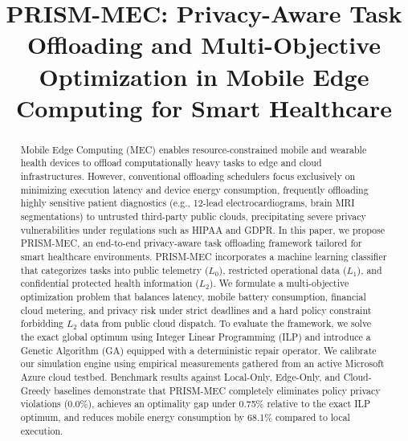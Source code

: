 \documentclass[conference]{IEEEtran}
\begin{document}
\title{PRISM-MEC: Privacy-Aware Task Offloading and Multi-Objective Optimization in Mobile Edge Computing for Smart Healthcare}

\author{
}

\maketitle

\begin{abstract}
Mobile Edge Computing (MEC) enables resource-constrained mobile and wearable health devices to offload computationally heavy tasks to edge and cloud infrastructures. However, conventional offloading schedulers focus exclusively on minimizing execution latency and device energy consumption, frequently offloading highly sensitive patient diagnostics (e.g., 12-lead electrocardiograms, brain MRI segmentations) to untrusted third-party public clouds, precipitating severe privacy vulnerabilities under regulations such as HIPAA and GDPR. In this paper, we propose PRISM-MEC, an end-to-end privacy-aware task offloading framework tailored for smart healthcare environments. PRISM-MEC incorporates a machine learning classifier that categorizes tasks into public telemetry ($L_0$), restricted operational data ($L_1$), and confidential protected health information ($L_2$). We formulate a multi-objective optimization problem that balances latency, mobile battery consumption, financial cloud metering, and privacy risk under strict deadlines and a hard policy constraint forbidding $L_2$ data from public cloud dispatch. To evaluate the framework, we solve the exact global optimum using Integer Linear Programming (ILP) and introduce a Genetic Algorithm (GA) equipped with a deterministic repair operator. We calibrate our simulation engine using empirical measurements gathered from an active Microsoft Azure cloud testbed. Benchmark results against Local-Only, Edge-Only, and Cloud-Greedy baselines demonstrate that PRISM-MEC completely eliminates policy privacy violations (0.0\%), achieves an optimality gap under 0.75\% relative to the exact ILP optimum, and reduces mobile energy consumption by 68.1\% compared to local execution.
\end{abstract}
\end{document}
